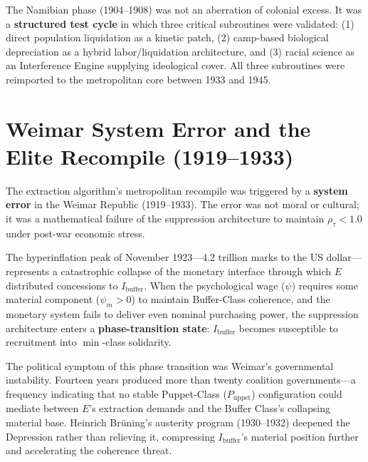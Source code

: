 \begin{keyinsight}
The Namibian phase (1904--1908) was not an aberration of colonial excess. It was a \textbf{structured test cycle} in which three critical subroutines were validated: (1) direct population liquidation as a kinetic patch, (2) camp-based biological depreciation as a hybrid labor/liquidation architecture, and (3) racial science as an Interference Engine supplying ideological cover. All three subroutines were reimported to the metropolitan core between 1933 and 1945.
\end{keyinsight}


\section{Weimar System Error and the Elite Recompile (1919--1933)}
\label{sec:weimar_error}

The extraction algorithm's metropolitan recompile was triggered by a \textbf{system error} in the Weimar Republic (1919--1933). The error was not moral or cultural; it was a mathematical failure of the suppression architecture to maintain $\rho_{\tau} < 1.0$ under post-war economic stress.

The hyperinflation peak of November 1923---4.2 trillion marks to the US dollar---represents a catastrophic collapse of the monetary interface through which $E$ distributed concessions to $I_{\text{buffer}}$. When the psychological wage ($\psi$) requires some material component ($\psi_m > 0$) to maintain Buffer-Class coherence, and the monetary system fails to deliver even nominal purchasing power, the suppression architecture enters a \textbf{phase-transition state}: $I_{\text{buffer}}$ becomes susceptible to recruitment into $\min$-class solidarity.

The political symptom of this phase transition was Weimar's governmental instability. Fourteen years produced more than twenty coalition governments---a frequency indicating that no stable Puppet-Class ($P_{\text{uppet}}$) configuration could mediate between $E$'s extraction demands and the Buffer Class's collapsing material base. Heinrich Br\"{u}ning's austerity program (1930--1932) deepened the Depression rather than relieving it, compressing $I_{\text{buffer}}$'s material position further and accelerating the coherence threat.

